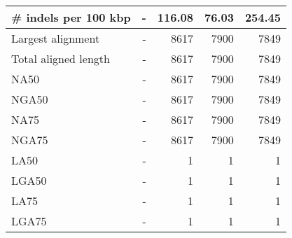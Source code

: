 \documentclass[12pt,a4paper]{article}
\begin{document}
\begin{table}[ht]
\begin{center}
\begin{tabular}{|l*{4}{|r}|}
\# indels per 100 kbp & - & 116.08 & 76.03 & 254.45 \\ \hline
Largest alignment & - & 8617 & 7900 & 7849 \\ \hline
Total aligned length & - & 8617 & 7900 & 7849 \\ \hline
NA50 & - & 8617 & 7900 & 7849 \\ \hline
NGA50 & - & 8617 & 7900 & 7849 \\ \hline
NA75 & - & 8617 & 7900 & 7849 \\ \hline
NGA75 & - & 8617 & 7900 & 7849 \\ \hline
LA50 & - & 1 & 1 & 1 \\ \hline
LGA50 & - & 1 & 1 & 1 \\ \hline
LA75 & - & 1 & 1 & 1 \\ \hline
LGA75 & - & 1 & 1 & 1 \\ \hline
\end{tabular}
\end{center}
\end{table}
\end{document}
